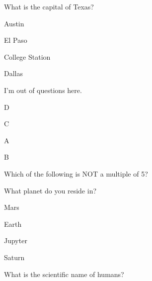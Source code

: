 \documentclass[12pt]{exam}
\begin{document}
\begin{questions}
    \question What is the capital of Texas?
    
        \begin{oneparchoices}
        
            \choice Austin
        
            \choice El Paso
        
            \choice College Station
        
            \choice Dallas
        
        \end{oneparchoices}

    \question I'm out of questions here.
    
        \begin{oneparchoices}
        
            \choice D
        
            \choice C
        
            \choice A
        
            \choice B
        
        \end{oneparchoices}

    \question Which of the following is NOT a multiple of 5?
    
        \begin{oneparchoices}
        
        
        
        
        
        \end{oneparchoices}

    \question What planet do you reside in?
    
        \begin{oneparchoices}
        
            \choice Mars
        
            \choice Earth
        
            \choice Jupyter
        
            \choice Saturn
        
        \end{oneparchoices}

    \question What is the scientific name of humans?
    
        \begin{oneparchoices}
        

\end{oneparchoices}
\end{questions}
\end{document}

